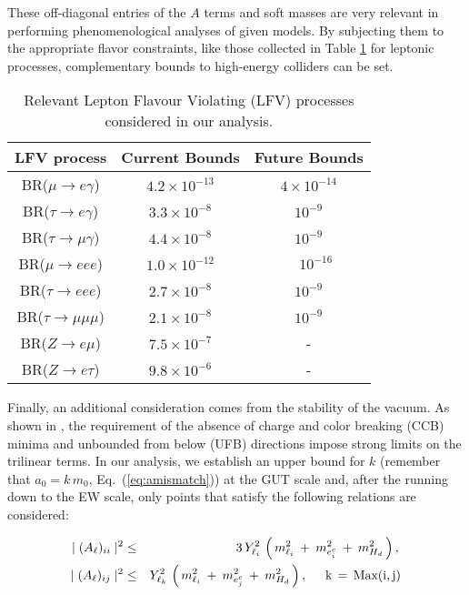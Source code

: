 \documentclass[a4paper,11pt]{article}
\newcommand{\bea}{\begin{eqnarray}}
\newcommand{\eea}{\end{eqnarray}}
\newcommand{\eq}[1]{Eq.~(\ref{#1})}
\begin{document}
These off-diagonal entries of the $A$ terms and soft masses are very relevant in performing phenomenological analyses of given models. By subjecting them to the appropriate flavor constraints, like those collected in Table \ref{tab:LFVbounds} for leptonic processes, complementary bounds to high-energy colliders can be set. 

{\renewcommand{\arraystretch}{1.5}
\begin{table}[t!]
\centering 
\begin{tabular}{|c|c|c|}
\hline
LFV process & Current Bounds \cite{Olive:2016xmw}    & Future Bounds     \\
\hline 
BR($\mu  \to e \gamma$)     & $4.2 \times 10^{-13}$  & $4 \times 10^{-14}$ \cite{Baldini:2013ke} \\
BR($\tau \to e \gamma$)     & $3.3 \times 10^{-8}$   & \qquad $10^{-9}$ \cite{Aushev:2010bq} \\
BR($\tau \to \mu \gamma$)   & $4.4 \times 10^{-8}$   & \qquad $10^{-9}$ \cite{Aushev:2010bq} \\
BR($\mu  \to e e e$)        & $1.0 \times 10^{-12}$  & ~~\quad $10^{-16}$ \cite{Blondel:2013ia} \\
BR($\tau \to e e e$)        & $2.7 \times 10^{-8}$   & \qquad $10^{-9}$ \cite{Aushev:2010bq} \\
BR($\tau \to \mu \mu \mu$)  & $2.1 \times 10^{-8}$   & \qquad $10^{-9}$ \cite{Aushev:2010bq} \\
BR($Z \to e \mu$)           & $7.5 \times 10^{-7}$   & - \\
BR($Z \to e \tau$)          & $9.8 \times 10^{-6}$   & - \\
\hline
\end{tabular}
\caption{\label{tab:LFVbounds}Relevant Lepton Flavour Violating (LFV) processes considered in our analysis.}
\end{table}}

Finally, an additional consideration comes from the stability of the vacuum. As shown in  \cite{Casas:1996de}, the requirement of the absence of charge and color breaking (CCB) minima and unbounded from below (UFB) directions impose strong limits on the trilinear terms. In our analysis, we establish an upper bound for $k$ (remember that $a_0=k\, m_0$, \eq{eq:amismatch}) at the GUT scale and, after the running down to the EW scale, only points that satisfy the following relations are considered:

\bea
\mid (A_\ell)_{ii} \mid^2 & \leq & 3\, Y_{\ell_i}^2\, \left(\,m_{\ell_i}^2 \:+\: m_{e^c_i}^2 \:+\: m_{H_d}^2 \,\right),\, \label{eqn:colorcharge1}\\
\mid (A_\ell)_{ij} \mid^2 & \leq & Y_{\ell_k}^2\, \left(\,m_{\ell_i}^2 \:+\: m_{e^c_j}^2 \:+\: m_{H_d}^2 \,\right), \hspace{0.5cm} {\rm k\, =\, Max(i,j)} \label{eqn:colorcharge2}
\eea
\end{document}
